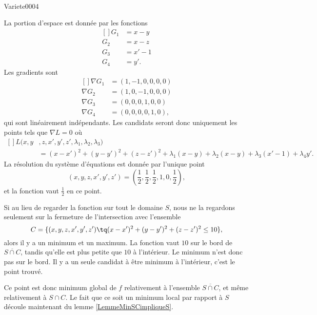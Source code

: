
\begin{corrige}{Variete0004}

	La portion d'espace est donnée par les fonctions
	\begin{equation}
		\begin{aligned}[]
			G_1&=x-y\\
			G_2&=x-z\\
			G_3&=x'-1\\
			G_4&=y'.
		\end{aligned}
	\end{equation}
	Les gradients sont
	\begin{equation}
		\begin{aligned}[]
			\nabla G_1&=(1,-1,0,0,0,0)\\
			\nabla G_2&=(1,0,-1,0,0,0)\\
			\nabla G_3&=(0,0,0,1,0,0)\\
			\nabla G_4&=(0,0,0,0,1,0),
		\end{aligned}
	\end{equation}
	qui sont linéairement indépendants. Les candidats seront donc uniquement les points tels que $\nabla L=0$ où
	\begin{equation}
		\begin{aligned}[]
			L(x,y&,z,x',y',z',\lambda_1,\lambda_2,\lambda_3)\\
					&=(x-x')^2+(y-y')^2+(z-z')^2+\lambda_1(x-y)+\lambda_2(x-y)+\lambda_3(x'-1)+\lambda_4 y'.
		\end{aligned}
	\end{equation}
	La résolution du système d'équations est donnée par l'unique point
	\begin{equation}
		(x,y,z,x',y',z')=(\frac{ 1 }{2},\frac{ 1 }{2},\frac{ 1 }{2},1,0,\frac{ 1 }{2}),
	\end{equation}
	et la fonction vaut $\frac{1}{ 2 }$ en ce point.

	Si au lieu de regarder la fonction sur tout le domaine $S$, nous ne la regardons seulement sur la fermeture de l'intersection avec l'ensemble
	\begin{equation}
		C=\{ (x,y,z,x',y',z')\tq (x-x')^2+(y-y')^2+(z-z')^2\leq 10 \},
	\end{equation}
	alors il y a un minimum et un maximum. La fonction vaut $10$ sur le bord de $\overline{S\cap C}$, tandis qu'elle est plus petite que $10$ à l'intérieur. Le minimum n'est donc pas sur le bord. Il y a un seule candidat à être minimum à l'intérieur, c'est le point trouvé.

	Ce point est donc minimum global de $f$ relativement à l'ensemble $\overline{S\cap C}$, et même relativement à $S\cap C$. Le fait que ce soit un minimum local par rapport à $S$ découle maintenant du lemme \ref{LemmeMinSCimpliqueS}.

\end{corrige}
